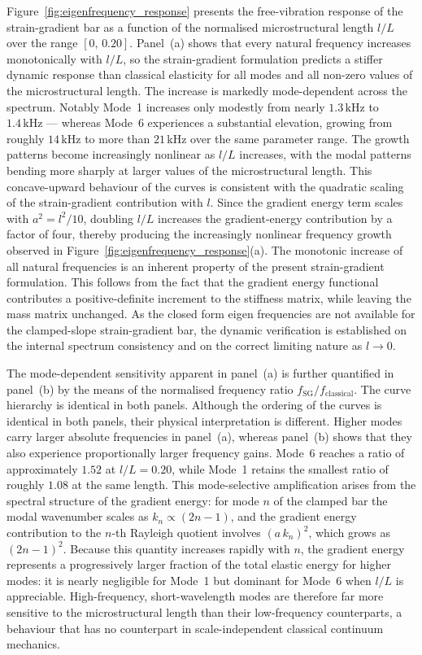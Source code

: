 \documentclass[final,3p,times,fleqn]{elsarticle}
\begin{document}
Figure~\ref{fig:eigenfrequency_response} presents the free-vibration
response of the strain-gradient bar as a function of the normalised
microstructural length $l/L$ over the range $[0,\,0.20]$.
Panel~(a) shows that every natural frequency increases monotonically
with $l/L$, so the strain-gradient formulation predicts a stiffer
dynamic response than classical elasticity for all modes and all
non-zero values of the microstructural length.
The increase is markedly mode-dependent across the spectrum. Notably Mode~1 increases only
modestly from nearly $1.3\,\mathrm{kHz}$ to
$1.4\,\mathrm{kHz}$ --- whereas Mode~6 experiences a substantial 
elevation, growing from roughly $14\,\mathrm{kHz}$ to more than
$21\,\mathrm{kHz}$ over the same parameter range.
The growth patterns become increasingly nonlinear as $l/L$ increases, with the
modal patterns bending more sharply at larger values of the microstructural length.
This concave-upward behaviour of the curves is consistent with the quadratic scaling
of the strain-gradient contribution with $l$. Since the gradient energy term scales
with $a^{2}=l^{2}/10$, doubling $l/L$ increases the gradient-energy contribution by
a factor of four, thereby producing the increasingly nonlinear frequency growth
observed in Figure~\ref{fig:eigenfrequency_response}(a). The monotonic increase of all natural frequencies is an inherent property of the
present strain-gradient formulation. This follows from the fact that the gradient
energy functional contributes a positive-definite increment to the stiffness matrix,
while leaving the mass matrix unchanged.
As the closed form eigen frequencies are not available for the clamped-slope
strain-gradient bar, the dynamic verification is established on the internal
 spectrum consistency and on the correct limiting nature
as $l \to 0$. 

The mode-dependent sensitivity apparent in panel~(a) is further quantified in panel~(b) by the means of 
the normalised frequency ratio
$f_{\mathrm{SG}}/f_{\mathrm{classical}}$.
The curve hierarchy is identical in both panels.
Although the ordering of the curves is identical in both panels, their physical
interpretation is different. Higher modes carry larger absolute frequencies in
panel~(a), whereas panel~(b) shows that they also experience proportionally
larger frequency gains. Mode~6 reaches a ratio of approximately $1.52$ at $l/L = 0.20$, while
Mode~1 retains the smallest ratio of roughly $1.08$ at the same length.
This mode-selective amplification arises from the spectral structure
of the gradient energy: for mode $n$ of the clamped bar the modal
wavenumber scales as $k_{n} \propto (2n-1)$, and the gradient energy
contribution to the $n$-th Rayleigh quotient involves
$(a\,k_{n})^{2}$, which grows as $(2n-1)^{2}$.
Because this quantity increases rapidly with $n$, the gradient energy
represents a progressively larger fraction of the total elastic energy
for higher modes: it is nearly negligible for Mode~1 but dominant for
Mode~6 when $l/L$ is appreciable.
High-frequency, short-wavelength modes are therefore far more sensitive
to the microstructural length than their low-frequency counterparts,
a behaviour that has no counterpart in scale-independent classical
continuum mechanics.
\end{document}

